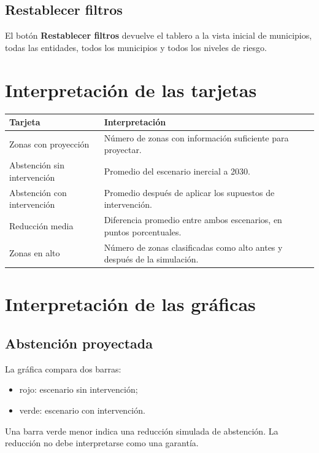 \documentclass[11pt,a4paper]{article}
\begin{document}
\subsection{Restablecer filtros}

El botón \textbf{Restablecer filtros} devuelve el tablero a la vista inicial de municipios, todas las entidades, todos los municipios y todos los niveles de riesgo.

\section{Interpretación de las tarjetas}

\begin{longtable}{p{}p{}}
\toprule
\textbf{Tarjeta} & \textbf{Interpretación}\\
\midrule
Zonas con proyección & Número de zonas con información suficiente para proyectar.\\
Abstención sin intervención & Promedio del escenario inercial a 2030.\\
Abstención con intervención & Promedio después de aplicar los supuestos de intervención.\\
Reducción media & Diferencia promedio entre ambos escenarios, en puntos porcentuales.\\
Zonas en alto & Número de zonas clasificadas como alto antes y después de la simulación.\\
\bottomrule
\end{longtable}

\section{Interpretación de las gráficas}

\subsection{Abstención proyectada}

La gráfica compara dos barras:

\begin{itemize}
    \item rojo: escenario sin intervención;
    \item verde: escenario con intervención.
\end{itemize}

Una barra verde menor indica una reducción simulada de abstención. La reducción no debe interpretarse como una garantía.
\end{document}
